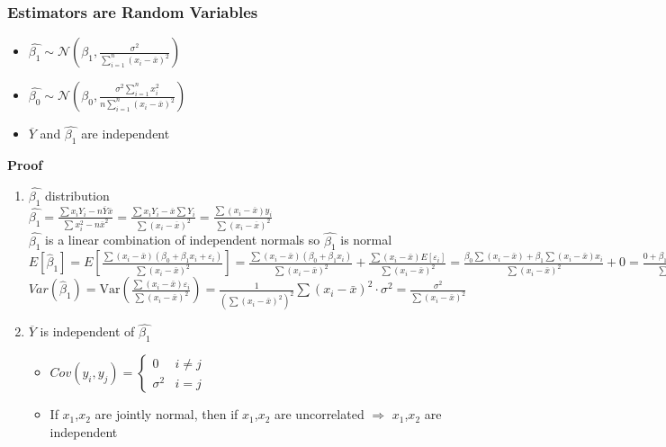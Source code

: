 \documentclass{article}
\begin{document}
\subsubsection{Estimators are Random Variables}
\begin{itemize}
    \item $\hat{\beta_1}\sim\mathcal{N}(\beta_1,\frac{\sigma^2}{\sum_{i=1}^n(x_i-\overline{x})^2})$
    \item $\hat{\beta_0}\sim\mathcal{N}(\beta_0,\frac{\sigma^2\sum_{i=1}^nx_i^2}{n\sum_{i=1}^n(x_i-\overline{x})^2})$
    \item $\overline{Y}$ and $\hat{\beta_1}$ are independent
\end{itemize}
\textbf{Proof}
\begin{enumerate}
    \item $\hat{\beta_1}$ distribution\\
    $\hat{\beta_1}=\frac{\sum x_iY_i-n\overline{Y}\overline{x}}{\sum x_i^2-n\overline{x}^2}=\frac{\sum x_iY_i-\overline{x}\sum Y_i}{\sum(x_i-\overline{x})^2}=\frac{\sum(x_i-\overline{x})y_i}{\sum(x_i-\overline{x})^2}$\\
    $\hat{\beta_1}$ is a linear combination of independent normals so $\hat{\beta_1}$ is normal\\
    $E[\hat{\beta}_1] = E\left[ \frac{\sum (x_i - \bar{x})(\beta_0 + \beta_1 x_i + \varepsilon_i)}{\sum (x_i - \bar{x})^2} \right]
= \frac{\sum (x_i - \bar{x})(\beta_0 + \beta_1 x_i)}{\sum (x_i - \bar{x})^2}
+ \frac{\sum (x_i - \bar{x}) E[\varepsilon_i]}{\sum (x_i - \bar{x})^2}=\frac{\beta_0 \sum (x_i - \bar{x}) + \beta_1 \sum (x_i - \bar{x})x_i}{\sum (x_i - \bar{x})^2} + 0
= \frac{0 + \beta_1 \sum (x_i - \bar{x})x_i}{\sum (x_i - \bar{x})^2}
= \beta_1$\\
    $Var(\hat\beta_1)=\text{Var} \left( \frac{\sum (x_i - \bar{x}) \varepsilon_i}{\sum (x_i - \bar{x})^2} \right)
= \frac{1}{\left( \sum (x_i - \bar{x})^2 \right)^2} \sum (x_i - \bar{x})^2 \cdot \sigma^2
= \frac{\sigma^2}{\sum (x_i - \bar{x})^2}$
    \item $\overline{Y}$ is independent of $\hat{\beta_1}$
    \begin{itemize}
        \item $Cov(y_i,y_j)=\begin{cases}0&i\neq j\\\sigma^2&i=j\end{cases}$
        \item If $x_1$,$x_2$ are jointly normal, then if $x_1$,$x_2$ are uncorrelated $\Rightarrow$ $x_1$,$x_2$ are independent

\end{itemize}
\end{enumerate}
\end{document}
